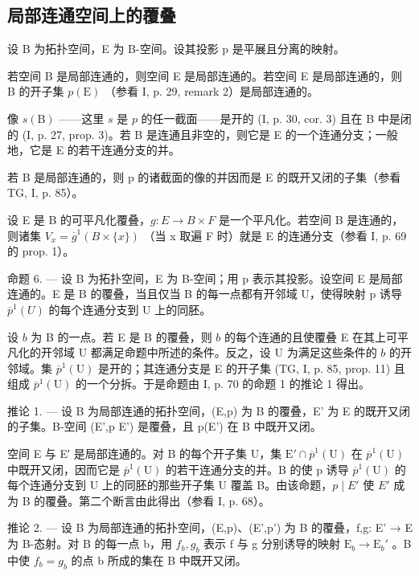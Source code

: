 \subsection{局部连通空间上的覆叠}

设 B 为拓扑空间，E 为 B-空间。设其投影 p 是平展且分离的映射。

若空间 B 是局部连通的，则空间 E 是局部连通的。若空间 E 是局部连通的，则 B 的开子集 \(p(\mathrm{E})\) （参看 I, p. 29, remark 2）是局部连通的。

像 \(s(\mathrm{B})\) ——这里 \(s\) 是 \(p\) 的任一截面——是开的 (I, p. 30, cor. 3) 且在 B 中是闭的 (I, p. 27, prop. 3)。若 B 是连通且非空的，则它是 E 的一个连通分支；一般地，它是 E 的若干连通分支的并。

若 B 是局部连通的，则 p 的诸截面的像的并因而是 E 的既开又闭的子集（参看 TG, I, p. 85）。

设 E 是 B 的可平凡化覆叠，\(g: E \to B \times F\) 是一个平凡化。若空间 B 是连通的，则诸集 \(V_{x} = \overline{g}^{1}(B \times \{x\})\) （当 x 取遍 F 时）就是 E 的连通分支（参看 I, p. 69 的 prop. 1）。

命题 6. --- 设 B 为拓扑空间，E 为 B-空间；用 p 表示其投影。设空间 E 是局部连通的。E 是 B 的覆叠，当且仅当 B 的每一点都有开邻域 U，使得映射 p 诱导 \(\overline{p}^{1}(U)\) 的每个连通分支到 U 上的同胚。

设 \(b\) 为 B 的一点。若 E 是 B 的覆叠，则 \(b\) 的每个连通的且使覆叠 E 在其上可平凡化的开邻域 U 都满足命题中所述的条件。反之，设 U 为满足这些条件的 \(b\) 的开邻域。集 \(\overline{p}^{1}(\mathrm{U})\) 是开的；其连通分支是 E 的开子集 (TG, I, p. 85, prop. 11) 且组成 \(\overline{p}^{1}(\mathrm{U})\) 的一个分拆。于是命题由 I, p. 70 的命题 1 的推论 1 得出。

推论 1. — 设 B 为局部连通的拓扑空间，(E,p) 为 B 的覆叠，E' 为 E 的既开又闭的子集。B-空间 (E',p \textbar{} E') 是覆叠，且 p(E') 在 B 中既开又闭。

空间 E 与 E′ 是局部连通的。对 B 的每个开子集 U，集 \(\mathrm{E}'\cap\overline{p}^{1}(\mathrm{U})\) 在 \(\overline{p}^{1}(\mathrm{U})\) 中既开又闭，因而它是 \(\overline{p}^{1}(\mathrm{U})\) 的若干连通分支的并。B 的使 p 诱导 \(\overline{p}^{1}(\mathrm{U})\) 的每个连通分支到 U 上的同胚的那些开子集 U 覆盖 B。由该命题，\(p\mid E'\) 使 \(E'\) 成为 B 的覆叠。第二个断言由此得出（参看 I, p. 68）。

推论 2. --- 设 B 为局部连通的拓扑空间，(E,p)、(E',p') 为 B 的覆叠，f,g: E' → E 为 B-态射。对 B 的每一点 b，用 \(f_b,g_b\) 表示 f 与 g 分别诱导的映射 \(\mathrm{E}_b\to \mathrm{E}_b'\) 。B 中使 \(f_b = g_b\) 的点 b 所成的集在 B 中既开又闭。

